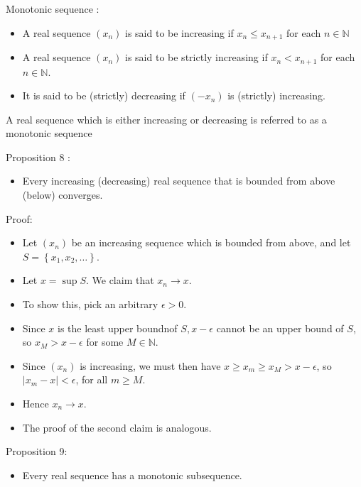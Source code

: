 \documentclass[12pt,a4paper]{article}
\begin{document}
Monotonic sequence :
\begin{itemize}
    \item A real sequence \(\left(x_n\right)\) is said to be increasing if \(x_n \leq x_{n+1}\) for each \(n \in \mathbb{N}\)
    \item A real sequence \(\left(x_n\right)\) is said to be strictly increasing if \(x_n<x_{n+1}\) for each \(n \in \mathbb{N}\).
    \item It is said to be (strictly) decreasing if \(\left(-x_n\right)\) is (strictly) increasing.
\end{itemize}
\begin{tcolorbox}
        A real sequence which is either increasing or decreasing is referred to as a monotonic sequence    
\end{tcolorbox}

Proposition 8 :
\begin{itemize}
    \item Every increasing (decreasing) real sequence that is bounded from above (below) converges.
\end{itemize}

Proof:
\begin{itemize}
    \item Let \(\left(x_n\right)\) be an increasing sequence which is bounded from above, and let \(S=\left\{x_1, x_2, \ldots\right\}\).
    \item Let \(x=\sup S\). We claim that \(x_n \rightarrow x\).
    \item To show this, pick an arbitrary \(\epsilon>0\).
    \item Since \(x\) is the least upper boundnof \(S, x-\epsilon\) cannot be an upper bound of \(S\), so \(x_M>x-\epsilon\) for some \(M \in \mathbb{N}\).
    \item Since \(\left(x_n\right)\) is increasing, we must then have \(x \geq x_m \geq x_M>x-\epsilon\), so \(\left|x_m-x\right|<\epsilon\), for all \(m \geq M\).
    \item Hence \(x_n \rightarrow x\).
    \item The proof of the second claim is analogous.
\end{itemize}

Proposition 9:
\begin{itemize}
    \item Every real sequence has a monotonic subsequence.
\end{itemize}
\end{document}
